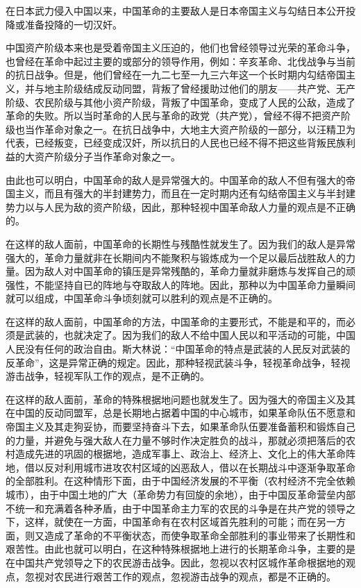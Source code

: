 \documentclass[UTF8, 12pt, a4paper]{ctexrep}
\begin{document}
在日本武力侵入中国以来，中国革命的主要敌人是日本帝国主义与勾结日本公开投降或准备投降的一切汉奸。

中国资产阶级本来也是受着帝国主义压迫的，他们也曾经领导过光荣的革命斗争，也曾经在革命中起过主要的或部分的领导作用，例如：辛亥革命、北伐战争与当前的抗日战争。但是，他们曾经在一九二七至一九三六年这一个长时期内勾结帝国主义，并与地主阶级结成反动同盟，背叛了曾经援助过他们的朋友——共产党、无产阶级、农民阶级与其他小资产阶级，背叛了中国革命，变成了人民的公敌，造成了革命的失败。所以当时革命的人民与革命的政党（共产党），曾经不得不把资产阶级也当作革命对象之一。在抗日战争中，大地主大资产阶级的一部分，以汪精卫为代表，已经叛变，已经变成汉奸，所以抗日的人民也已经不得不把这些背叛民族利益的大资产阶级分子当作革命对象之一。

由此也可以明白，中国革命的敌人是异常强大的。中国革命的敌人不但有强大的帝国主义，而且有强大的半封建势力，而且在一定时期内还有勾结帝国主义与半封建势力以与人民为敌的资产阶级，因此，那种轻视中国革命敌人力量的观点是不正确的。

在这样的敌人面前，中国革命的长期性与残酷性就发生了。因为我们的敌人是异常强大的，革命力量就非在长期间内不能聚积与锻炼成为一个足以最后战胜敌人的力量。因为敌人对中国革命的镇压是异常残酷的，革命力量就非磨炼与发挥自己的顽强性，不能坚持自已的阵地与夺取敌人的阵地。因此，那种以为中国革命力量瞬间就可以组成，中国革命斗争顷刻就可以胜利的观点是不正确的。

在这样的敌人面前，中国革命的方法，中国革命的主要形式，不能是和平的，而必须是武装的，也就决定了。因为我们的敌人不给中国人民以和平活动的可能，中国人民没有任何的政治自由。斯大林说：“中国革命的特点是武装的人民反对武装的反革命”，这是异常正确的规定。因此，那种轻视武装斗争，轻视革命战争，轻视游击战争，轻视军队工作的观点，是不正确的。

在这样的敌人面前，革命的特殊根据地问题也就发生了。因为强大的帝国主义及其在中国的反动同盟军，总是长期地占据着中国的中心城市，如果革命队伍不愿意和帝国主义及其走狗妥协，而要坚持奋斗下去，如果革命队伍要准备蓄积和锻炼自己的力量，并避免与强大敌人在力量不够时作决定胜负的战斗，那就必须把落后的农村造成先进的巩固的根据地，造成军事上、政治上、经济上、文化上的伟大革命阵地，借以反对利用城市进攻农村区域的凶恶敌人，借以在长期战斗中逐渐争取革命的全部胜利。在这种情形下面，由于中国经济发展的不平衡（农村经济不完全依赖城市），由于中国土地的广大（革命势力有回旋的余地），由于中国反革命营垒内部不统一和充满着各种矛盾，由于中国革命主力军的农民的斗争是在共产党的领导之下，这样，就使在一方面，中国革命有在农村区域首先胜利的可能；而在另一方面，则又造成了革命的不平衡状态，而使争取革命全部胜利的事业带来了长期性和艰苦性。由此也就可以明白，在这种特殊根据地上进行的长期革命斗争，主要的是在中国共产党领导之下的农民游击战争。因此，忽视以农村区城作革命根据地的观点，忽视对农民进行艰苦工作的观点，忽视游击战争的观点，都是不正确的。
\end{document}
